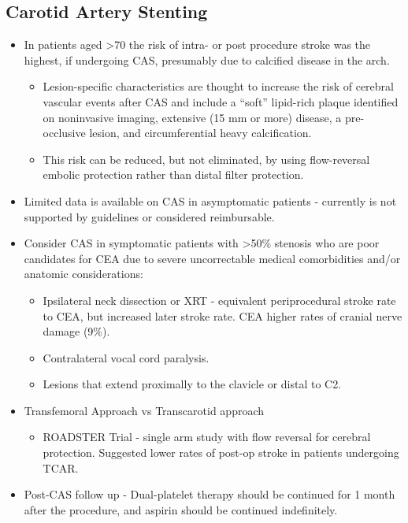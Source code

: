 \documentclass[
]{book}
\providecommand{\tightlist}{%
  \setlength{\itemsep}{0pt}\setlength{\parskip}{0pt}}
\begin{document}
\hypertarget{carotid-artery-stenting}{%
\subsection{Carotid Artery Stenting}\label{carotid-artery-stenting}}

\begin{itemize}
\item
  In patients aged \textgreater70 the risk of intra- or post procedure stroke was
  the highest, if undergoing CAS, presumably due to calcified disease
  in the arch.

  \begin{itemize}
  \item
    Lesion-specific characteristics are thought to increase the risk
    of cerebral vascular events after CAS and include a ``soft''
    lipid-rich plaque identified on noninvasive imaging, extensive
    (15 mm or more) disease, a pre-occlusive lesion, and
    circumferential heavy calcification.
  \item
    This risk can be reduced, but not eliminated, by using
    flow-reversal embolic protection rather than distal filter
    protection.
  \end{itemize}
\item
  Limited data is available on CAS in asymptomatic patients -
  currently is not supported by guidelines or considered reimbursable.
\item
  Consider CAS in symptomatic patients with \textgreater50\% stenosis who are poor
  candidates for CEA due to severe uncorrectable medical comorbidities
  and/or anatomic considerations:

  \begin{itemize}
  \item
    Ipsilateral neck dissection or XRT - equivalent periprocedural
    stroke rate to CEA, but increased later stroke rate. CEA higher
    rates of cranial nerve damage (9\%).
    \citep{giannopoulosRevascularizationRadiationinducedCarotid2018}
  \item
    Contralateral vocal cord paralysis.
  \item
    Lesions that extend proximally to the clavicle or distal to C2.
  \end{itemize}
\item
  Transfemoral Approach vs Transcarotid approach

  \begin{itemize}
  \tightlist
  \item
    ROADSTER Trial - single arm study with flow reversal for
    cerebral protection. Suggested lower rates of post-op stroke in
    patients undergoing TCAR.
  \end{itemize}
\item
  Post-CAS follow up - Dual-platelet therapy should be continued for 1
  month after the procedure, and aspirin should be continued
  indefinitely.


\end{itemize}
\end{document}
